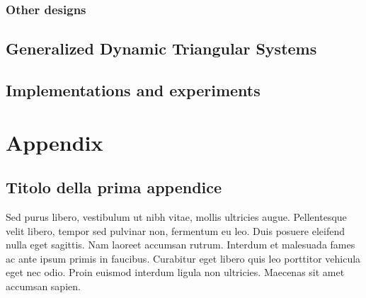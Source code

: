 \documentclass[target=mst]{thud}
\begin{document}
\section{Other designs}
\chapter{Generalized Dynamic Triangular Systems}

\chapter{Implementations and experiments}


\appendix

\part{Appendix}

\chapter{Titolo della prima appendice}
Sed purus libero, vestibulum ut nibh vitae, mollis ultricies augue. Pellentesque velit libero, tempor sed
pulvinar non, fermentum eu leo. Duis posuere eleifend nulla eget sagittis. Nam laoreet accumsan rutrum.
Interdum et malesuada fames ac ante ipsum primis in faucibus. Curabitur eget libero quis leo porttitor
vehicula eget nec odio. Proin euismod interdum ligula non ultricies. Maecenas sit amet accumsan sapien.

\backmatter%




\end{document}
